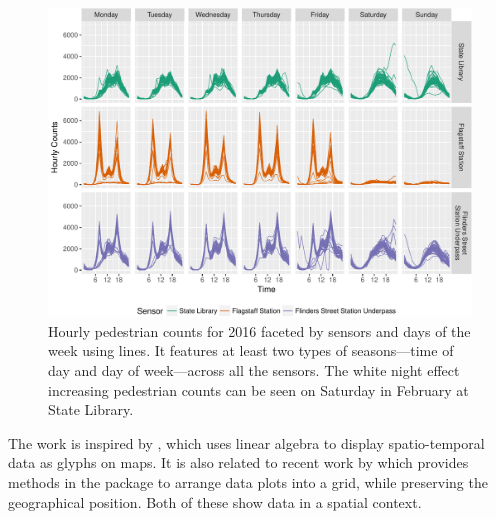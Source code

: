 \documentclass[article]{jss}
\theoremstyle{definition}
\theoremstyle{definition}
\theoremstyle{remark}
\begin{document}
\begin{CodeChunk}
\begin{figure}

{\centering \includegraphics[width=\textwidth]{figure/facet-time-1} 

}

\caption[Hourly pedestrian counts for 2016 faceted by
sensors and days of the week using lines. It features at least two types
of seasons---time of day and day of week---across all the sensors. The
white night effect increasing pedestrian counts can be seen on Saturday
in February at State Library.]{Hourly pedestrian counts for 2016 faceted by
sensors and days of the week using lines. It features at least two types
of seasons---time of day and day of week---across all the sensors. The
white night effect increasing pedestrian counts can be seen on Saturday
in February at State Library.}\label{fig:facet-time}
\end{figure}
\end{CodeChunk}







The work is inspired by \citet{Wickham2012glyph}, which uses linear
algebra to display spatio-temporal data as glyphs on maps. It is also
related to recent work by \citet{R-geofacet} which provides methods in
the  package to arrange data plots into a grid, while
preserving the geographical position. Both of these show data in a
spatial context.
\end{document}
